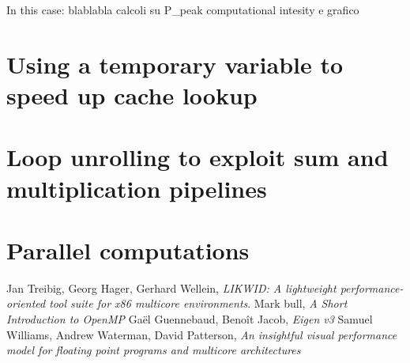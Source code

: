\documentclass[11pt,a4paper,oneside,titlepage,openright]{book}
\begin{document}
In this case: blablabla calcoli su P_peak computational intesity e grafico 

\chapter{Using a temporary variable to speed up cache lookup}

\chapter{Loop unrolling to exploit sum and multiplication pipelines}

\chapter{Parallel computations}

\begin{thebibliography}{1}
Jan Treibig, Georg Hager, Gerhard Wellein, \textit{LIKWID: A lightweight performance-oriented tool suite for x86 multicore environments}. 
Mark bull, \textit{A Short Introduction to OpenMP}
Ga\"{e}l Guennebaud, Beno\^{i}t Jacob, \textit{Eigen v3}
Samuel Williams, Andrew Waterman, David Patterson, \textit{An insightful visual performance model for floating point programs and multicore architectures}
\end{thebibliography}
 
 
 
 
 
\end{document}

